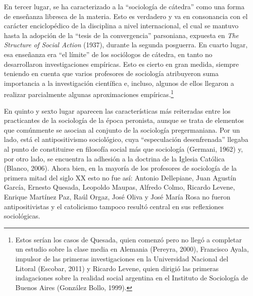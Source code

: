 En tercer lugar, se ha caracterizado a la ``sociología de cátedra'' como una forma de enseñanza libresca de la materia. Esto es verdadero y va en consonancia con el carácter enciclopédico de la disciplina a nivel internacional, el cual se mantuvo hasta la adopción de la ``tesis de la convergencia'' parsoniana, expuesta en \emph{The Structure of Social Action} (1937), durante la segunda posguerra. En cuarto lugar, esa enseñanza era ``el límite'' de los sociólogos de cátedra, en tanto no desarrollaron investigaciones empíricas. Esto es cierto en gran medida, siempre teniendo en cuenta que varios profesores de sociología atribuyeron suma importancia a la investigación científica e, incluso, algunos de ellos llegaron a realizar parcialmente algunas aproximaciones empíricas.\footnote{Estos serían los casos de Quesada, quien comenzó pero no llegó a completar un estudio sobre la clase media en Alemania (Pereyra, 2000), Francisco Ayala, impulsor de las primeras investigaciones en la Universidad Nacional del Litoral (Escobar, 2011) y Ricardo Levene, quien dirigió las primeras indagaciones sobre la realidad social argentina en el Instituto de Sociología de Buenos Aires (González Bollo, 1999).}

En quinto y sexto lugar aparecen las características más reiteradas entre los practicantes de la sociología de la época peronista, aunque se trata de elementos que comúnmente se asocian al conjunto de la sociología pregermaniana. Por un lado, está el antipositivismo sociológico, cuya ``especulación desenfrenada'' llegaba al punto de constituirse en filosofía social más que sociología (Germani, 1962) y, por otro lado, se encuentra la adhesión a la doctrina de la Iglesia Católica (Blanco, 2006). Ahora bien, en la mayoría de los profesores de sociología de la primera mitad del siglo XX esto no fue así: Antonio Dellepiane, Juan Agustín García, Ernesto Quesada, Leopoldo Maupas, Alfredo Colmo, Ricardo Levene, Enrique Martínez Paz, Raúl Orgaz, José Oliva y José María Rosa no fueron antipositivistas y el catolicismo tampoco resultó central en sus reflexiones sociológicas.

